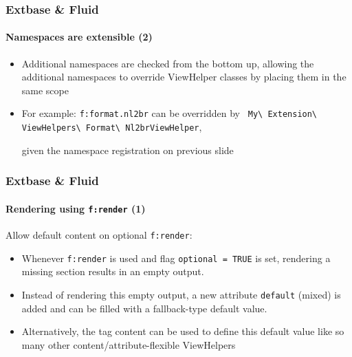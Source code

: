 
\begin{frame}[fragile]
	\frametitle{Extbase \& Fluid}
	\framesubtitle{Namespaces are extensible (2)}

	\begin{itemize}

		\item Additional namespaces are checked from the bottom up, allowing the
			additional namespaces to override ViewHelper classes by placing them in
			the same scope

		\item For example: \texttt{f:format.nl2br} can be overridden by
			\texttt{
				My\textbackslash
				Extension\textbackslash
				ViewHelpers\textbackslash
				Format\textbackslash
				Nl2brViewHelper},

				given the namespace registration on previous slide

	\end{itemize}

\end{frame}


\begin{frame}[fragile]
	\frametitle{Extbase \& Fluid}
	\framesubtitle{Rendering using \texttt{f:render} (1)}

	Allow default content on optional \texttt{f:render}:

	\begin{itemize}

		\item Whenever \texttt{f:render} is used and flag \texttt{optional = TRUE}
			is set, rendering a missing section results in an empty output.

		\item Instead of rendering this empty output, a new attribute \texttt{default}
			(mixed) is added and can be filled with a fallback-type default value.

		\item Alternatively, the tag content can be used to define this default value
			like so many other content/attribute-flexible ViewHelpers

	\end{itemize}

\end{frame}

